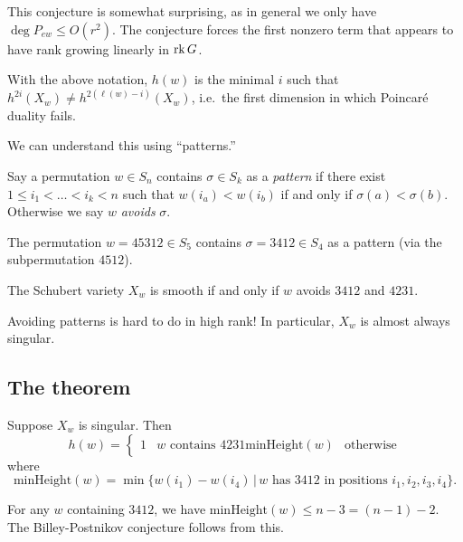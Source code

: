 \documentclass{amsart}
\begin{document}
This conjecture is somewhat surprising, as in general we only have $\deg P_{ew} \leq O(r^2)$.
The conjecture forces the first nonzero term that appears to have rank growing linearly in $\operatorname{rk} G$.

\begin{thm}
	With the above notation, $h(w)$ is the minimal $i$ such that $h^{2i}(X_w) \neq h^{2(\ell(w) - i)}(X_w)$, i.e.\ the first dimension in which Poincar\'e duality fails.
\end{thm}

We can understand this using ``patterns.''

\begin{dfn}
	Say a permutation $w \in S_n$ contains $\sigma \in S_k$ as a \emph{pattern} if there exist $1 \leq i_1 < \dots < i_k < n$ such that $w(i_a) < w(i_b)$ if and only if $\sigma(a) < \sigma(b)$.
	Otherwise we say $w$ \emph{avoids} $\sigma$.
\end{dfn}

\begin{ex}
	The permutation $w = 45312 \in S_5$ contains $\sigma = 3412 \in S_4$ as a pattern (via the subpermutation $4512$).
\end{ex}

\begin{thm}
	The Schubert variety $X_w$ is smooth if and only if $w$ avoids $3412$ and $4231$.
\end{thm}

Avoiding patterns is hard to do in high rank!
In particular, $X_w$ is almost always singular.

\subsection{The theorem}

\begin{thm}
	Suppose $X_w$ is singular.
	Then
	\[
		h(w) = \begin{cases}
			1 & \textrm{$w$ contains $4231$}
			\textrm{minHeight}(w) & \textrm{otherwise}
		\end{cases}
	\]
	where
	\[
		\mathrm{minHeight}(w) = \min \{ w(i_1) - w(i_4) \,|\, \textrm{$w$ has $3412$ in positions $i_1, i_2, i_3, i_4$}\}.
	\]
\end{thm}

For any $w$ containing $3412$, we have $\mathrm{minHeight}(w) \leq n - 3 = (n - 1) - 2$.
The Billey-Postnikov conjecture follows from this.
\end{document}
